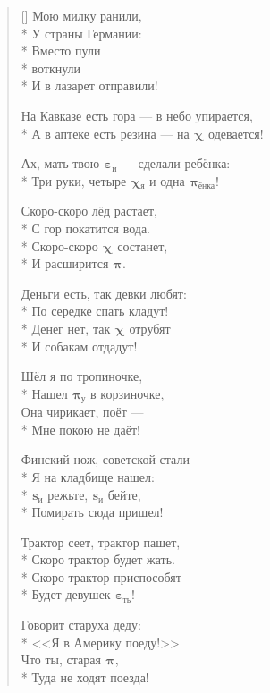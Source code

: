 \documentclass[a4paper,oneside,14pt]{scrbook}
\newcommand{\myPiz}[2]{$^{\text{#1}}${\large{$\boldsymbol{\pi}$}}$_{\text{#2}}$}
\newcommand{\myEbt}[2]{$^{\text{#1}}${\large{$\boldsymbol{\varepsilon}$}}$_{\text{#2}}$}
\newcommand{\myXyi}[2]{$^{\text{#1}}${\large{$\boldsymbol{\chi}$}}$_{\text{#2}}$}
\newcommand{\mySuk}[2]{$^{\text{#1}}${\large{$\boldsymbol{s}$}}$_{\text{#2}}$}
\begin{document}
\begin{verse}[\versewidth]
        Мою милку ранили,\\*
        У страны Германии:\\*
        Вместо пули\\*
        \vin {\myXyi{}{}} воткнули\\*
        И в лазарет отправили!

        На Кавказе есть гора --- в небо упирается,\\*
        А в аптеке есть резина --- на {\myXyi{}{}} одевается!
        
        Ах, мать твою {\myEbt{}{и}} --- сделали ребёнка:\\*
        Три руки, четыре {\myXyi{}{я}} и одна {\myPiz{}{ёнка}}!
        
        Скоро-скоро лёд растает,\\*
        С гор покатится вода.\\*
        Скоро-скоро {\myXyi{}{}} состанет,\\*
        И расширится {\myPiz{}{}}.
        
        Деньги есть, так девки любят:\\*
        По середке спать кладут!\\*
        Денег нет, так {\myXyi{}{}} отрубят\\*
        И собакам отдадут!
        
        Шёл я по тропиночке,\\*
        Нашел {\myPiz{}{у}} в корзиночке,\\
        Она чирикает, поёт ---\\*
        Мне покою не даёт!
        
        Финский нож, советской стали\\*
        \vin Я на кладбище нашел:\\*
        {\mySuk{}{и}} режьте, {\mySuk{}{и}} бейте,\\*
        \vin Помирать сюда пришел!

        Трактор сеет, трактор пашет,\\*
        \vin Скоро трактор будет жать.\\*
        Скоро трактор приспособят ---\\*
        \vin Будет девушек {\myEbt{}{ть}}!
        
        Говорит старуха деду:\\*
        <<Я в Америку поеду!>>\\
        Что ты, старая {\myPiz{}{}},\\*
        Туда не ходят поезда!
        

\end{verse}
\end{document}
